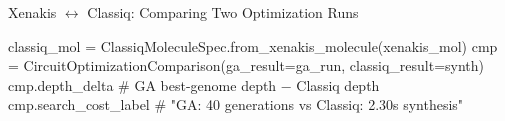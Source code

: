 \documentclass[
  ignorenonframetext,
  aspectratio=169,
]{beamer}
\newenvironment{Shaded}{\begin{snugshade}}{\end{snugshade}}
\newcommand{\BuiltInTok}[1]{\textcolor[rgb]{0.50,0.55,0.55}{#1}}
\newcommand{\CommentTok}[1]{\textcolor[rgb]{0.48,0.49,0.49}{#1}}
\newcommand{\NormalTok}[1]{\textcolor[rgb]{0.81,0.81,0.76}{#1}}
\newcommand{\OperatorTok}[1]{\textcolor[rgb]{0.81,0.81,0.76}{#1}}
\begin{document}
\begin{frame}[fragile]{Xenakis \(\leftrightarrow\) Classiq: Comparing
Two Optimization Runs}
\label{xenakis-leftrightarrow-classiq-comparing-two-optimization-runs}
\footnotesize

\begin{Shaded}
\begin{Highlighting}[]
\NormalTok{classiq\_mol }\OperatorTok{=}\NormalTok{ ClassiqMoleculeSpec.from\_xenakis\_molecule(xenakis\_mol)}
\BuiltInTok{cmp} \OperatorTok{=}\NormalTok{ CircuitOptimizationComparison(ga\_result}\OperatorTok{=}\NormalTok{ga\_run, classiq\_result}\OperatorTok{=}\NormalTok{synth)}
\BuiltInTok{cmp}\NormalTok{.depth\_delta          }\CommentTok{\# GA best{-}genome depth − Classiq depth}
\BuiltInTok{cmp}\NormalTok{.search\_cost\_label    }\CommentTok{\# "GA: 40 generations vs Classiq: 2.30s synthesis"}
\end{Highlighting}
\end{Shaded}

\normalsize
\end{frame}
\end{document}
